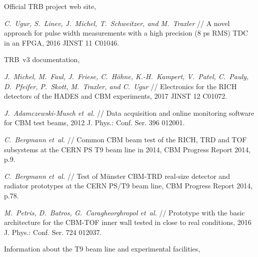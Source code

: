 \begin{thebibliography}{99}
Official TRB project web site,

\textit{C.~Ugur, S.~Linev, J.~Michel, T.~Schweitzer, and M.~Traxler} //
A novel approach for pulse width measurements with a high precision (8 ps RMS) TDC in an FPGA,
2016 JINST 11 C01046.


TRB~v3 documentation,

\textit{J.~Michel, M.~Faul, J.~Friese, C.~H\"{o}hne, K.-H.~Kampert, V.~Patel, C.~Pauly, D.~Pfeifer, P.~Skott, M.~Traxler, and C.~Ugur} //
Electronics for the RICH detectors of the HADES and CBM experiments,
2017 JINST 12 C01072.

\textit{J.~Adamczewski-Musch et~al.} //
Data acquisition and online monitoring software for CBM test beams,
2012 J. Phys.: Conf. Ser. 396 012001.

\textit{C.~Bergmann et~al.} //
Common CBM beam test of the RICH, TRD and TOF subsystems at the CERN PS T9 beam line in 2014,
CBM Progress Report 2014, p.9.

\textit{C.~Bergmann et~al.} //
Test of M\"unster CBM-TRD real-size detector and radiator prototypes at the CERN PS/T9 beam line,
CBM Progress Report 2014, p.78.

\textit{M.~Petris, D.~Batros, G.~Caragheorghropol et~al.} //
Prototype with the basic architecture for the CBM-TOF inner wall tested in close to real conditions,
2016 J. Phys.: Conf. Ser. 724 012037.

Information about the T9 beam line and experimental facilities,


\end{thebibliography}
